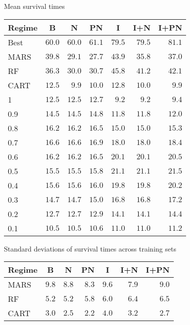 \documentclass[handout]{beamer}
\begin{document}
\appendix

\begin{frame}[c]{Mean survival times}
  \begin{table}
  \small
  \centering
  \begin{tabular}{lrrrrrr}
  \toprule \multicolumn{1}{c}{Regime}&\multicolumn{1}{c}{B}&\multicolumn{1}{c}{N}&\multicolumn{1}{c}{PN}&\multicolumn{1}{c}{I}&\multicolumn{1}{c}{I+N}&\multicolumn{1}{c}{I+PN}\tabularnewline
  \midrule
  Best&$60.0$&$60.0$&$61.1$&$79.5$&$79.5$&$81.1$\tabularnewline
  MARS&$39.8$&$29.1$&$27.7$&$43.9$&$35.8$&$37.0$\tabularnewline
  RF&$36.3$&$30.0$&$30.7$&$45.8$&$41.2$&$42.1$\tabularnewline
  CART&$12.5$&$ 9.9$&$10.0$&$12.8$&$10.0$&$ 9.9$\tabularnewline
  1&$12.5$&$12.5$&$12.7$&$ 9.2$&$ 9.2$&$ 9.4$\tabularnewline
  0.9&$14.5$&$14.5$&$14.8$&$11.8$&$11.8$&$12.0$\tabularnewline
  0.8&$16.2$&$16.2$&$16.5$&$15.0$&$15.0$&$15.3$\tabularnewline
  0.7&$16.6$&$16.6$&$16.9$&$18.0$&$18.0$&$18.4$\tabularnewline
  0.6&$16.2$&$16.2$&$16.5$&$20.1$&$20.1$&$20.5$\tabularnewline
  0.5&$15.5$&$15.5$&$15.8$&$21.1$&$21.1$&$21.5$\tabularnewline
  0.4&$15.6$&$15.6$&$16.0$&$19.8$&$19.8$&$20.2$\tabularnewline
  0.3&$14.7$&$14.7$&$15.0$&$16.8$&$16.8$&$17.2$\tabularnewline
  0.2&$12.7$&$12.7$&$12.9$&$14.1$&$14.1$&$14.4$\tabularnewline
  0.1&$10.5$&$10.5$&$10.6$&$11.0$&$11.0$&$11.2$\tabularnewline
  \bottomrule
  \end{tabular}
  \end{table}
\end{frame}

\begin{frame}{Standard deviations of survival times across training sets}
  \begin{table}[!htbp]
  \centering
  \begin{tabular}{lrrrrrr}
  \toprule \multicolumn{1}{c}{Regime}&\multicolumn{1}{c}{B}&\multicolumn{1}{c}{N}&\multicolumn{1}{c}{PN}&\multicolumn{1}{c}{I}&\multicolumn{1}{c}{I+N}&\multicolumn{1}{c}{I+PN}\tabularnewline
  \midrule
  MARS&$9.8$&$8.8$&$8.3$&$9.6$&$7.9$&$9.0$\tabularnewline
  RF&$5.2$&$5.2$&$5.8$&$6.0$&$6.4$&$6.5$\tabularnewline
  CART&$3.0$&$2.5$&$2.2$&$4.0$&$3.2$&$2.7$\tabularnewline
  \bottomrule
  \end{tabular}
  \end{table}
\end{frame}
\end{document}
